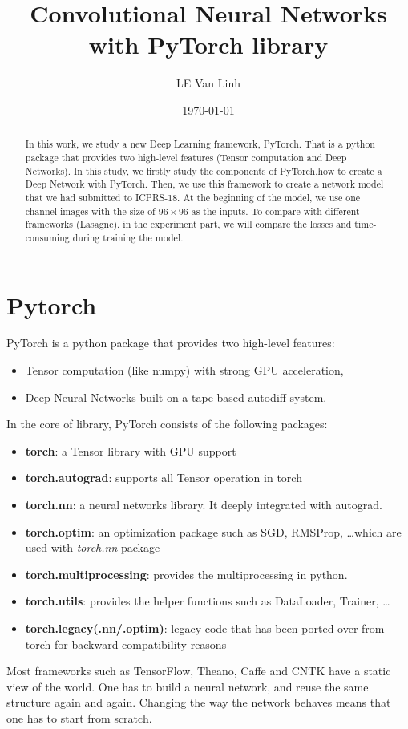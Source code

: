 \documentclass[12pt,a4paper]{article}
\begin{document}
\title{Convolutional Neural Networks with PyTorch library}
\author{LE Van Linh}
\date{\today}
\maketitle
\begin{abstract}
In this work, we study a new Deep Learning framework, PyTorch. That is a python package that provides two high-level features (Tensor computation and Deep Networks). In this study, we firstly study the components of PyTorch,how to create a Deep Network with PyTorch. Then, we use this framework to create a network model that we had submitted to ICPRS-18. At the beginning of the model, we use one channel images with the size of $96 \times 96$ as the inputs. To compare with different frameworks (Lasagne), in the experiment part, we will compare the losses and time-consuming during training the model.
\end{abstract}
\section{Pytorch}
PyTorch \cite{paszke2017automatic} is a python package that provides two high-level features:
\begin{itemize}
	\item Tensor computation (like numpy) with strong GPU acceleration,
	\item Deep Neural Networks built on a tape-based autodiff system.
\end{itemize}
In the core of library, PyTorch consists of the following packages:
\begin{itemize}
	\item \textbf{torch}: a Tensor library with GPU support
	\item \textbf{torch.autograd}: supports all Tensor operation in torch
	\item \textbf{torch.nn}: a neural networks library. It deeply integrated with autograd.
	\item \textbf{torch.optim}: an optimization package such as SGD, RMSProp, \ldots which are used with \textit{torch.nn} package
	\item \textbf{torch.multiprocessing}: provides the multiprocessing in python.
	\item \textbf{torch.utils}: provides the helper functions such as DataLoader, Trainer, \ldots
	\item \textbf{torch.legacy(.nn/.optim)}: legacy code that has been ported over from torch for backward compatibility reasons
\end{itemize}
Most frameworks such as TensorFlow, Theano, Caffe and CNTK have a static view of the world. One has to build a neural network, and reuse the same structure again and again. Changing the way the network behaves means that one has to start from scratch. 
\end{document}
